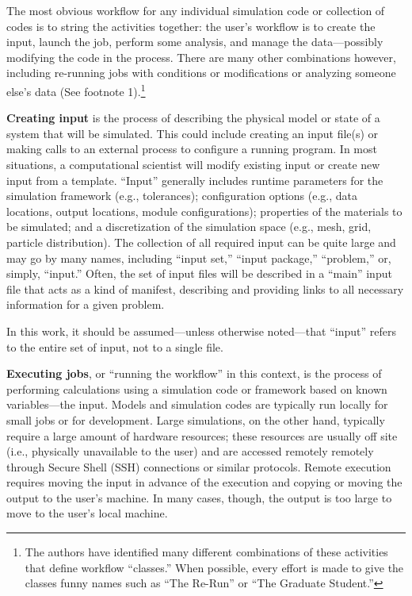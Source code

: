 The most obvious workflow for any individual simulation code or
collection of codes is to string the activities together: the user's
workflow is to create the input, launch the job, perform some analysis,
and manage the data---possibly modifying the code in the process. There
are many other combinations however, including re-running jobs with
conditions or modifications or analyzing someone else's data (See
footnote 1).\footnote{The
authors have identified many different combinations of these activities that
define workflow ``classes.'' When possible, every effort is made to give the
classes funny names such as ``The Re-Run'' or ``The Graduate Student.''}

\textbf{Creating input} is the process of describing the physical model
or state of a system that will be simulated. This could include creating
an input file(s) or making calls to an external process to configure a
running program. In most situations, a computational scientist will
modify existing input or create new input from a template. ``Input''
generally includes runtime parameters for the simulation framework
(e.g., tolerances); configuration options (e.g., data locations, output
locations, module configurations); properties of the materials to be
simulated; and a discretization of the simulation space (e.g., mesh,
grid, particle distribution). The collection of all required input can
be quite large and may go by many names, including ``input set,''
``input package,'' ``problem,'' or, simply, ``input.'' Often, the set of
input files will be described in a ``main'' input file that acts as a
kind of manifest, describing and providing links to all necessary
information for a given problem.

In this work, it should be assumed---unless otherwise noted---that
``input'' refers to the entire set of input, not to a single file.

\textbf{Executing jobs}, or ``running the workflow'' in this context, is
the process of performing calculations using a simulation code or
framework based on known variables---the input. Models and simulation
codes are typically run locally for small jobs or for development. Large
simulations, on the other hand, typically require a large amount of
hardware resources; these resources are usually off site (i.e.,
physically unavailable to the user) and are accessed remotely remotely
through Secure Shell (SSH) connections or similar protocols. Remote
execution requires moving the input in advance of the execution and
copying or moving the output to the user's machine. In many cases,
though, the output is too large to move to the user's local machine.

